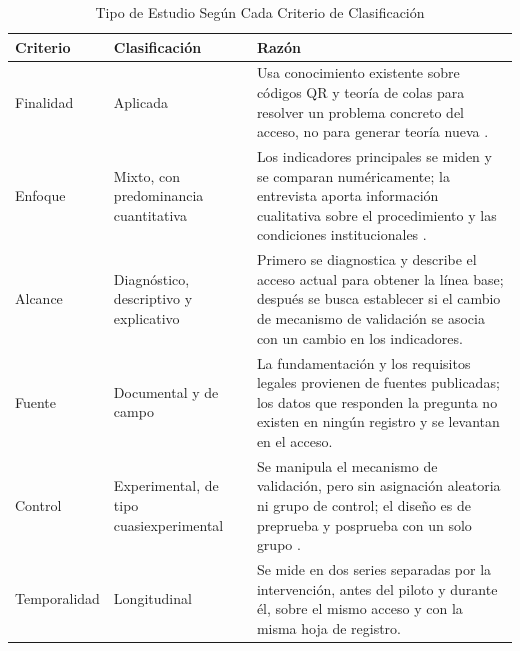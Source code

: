 \begin{table}[tbp]
	\caption{Tipo de Estudio Según Cada Criterio de Clasificación}
	\label{tab:tipo-estudio}
	\small\linespread{1}\selectfont
	\begin{tabular}{@{}P{2.3cm}P{3.6cm}P{9.6cm}@{}}
		\toprule
		Criterio     & Clasificación                                   & Razón                                                                                                                                                                                                         \\
		\midrule
		Finalidad    & Aplicada                                        & Usa conocimiento existente sobre códigos QR y teoría de colas para resolver un problema concreto del acceso, no para generar teoría nueva \parencite{oecd2015frascati}.                                      \\[0.5em]
		Enfoque      & Mixto, con predominancia cuantitativa           & Los indicadores principales se miden y se comparan numéricamente; la entrevista aporta información cualitativa sobre el procedimiento y las condiciones institucionales \parencite{hernandezsampieri2014metodologia}. \\[0.5em]
		Alcance      & Diagnóstico, descriptivo y explicativo          & Primero se diagnostica y describe el acceso actual para obtener la línea base; después se busca establecer si el cambio de mecanismo de validación se asocia con un cambio en los indicadores.             \\[0.5em]
		Fuente       & Documental y de campo                           & La fundamentación y los requisitos legales provienen de fuentes publicadas; los datos que responden la pregunta no existen en ningún registro y se levantan en el acceso.                                     \\[0.5em]
		Control      & Experimental, de tipo cuasiexperimental         & Se manipula el mecanismo de validación, pero sin asignación aleatoria ni grupo de control; el diseño es de preprueba y posprueba con un solo grupo \parencite{campbellstanley1963}.                      \\[0.5em]
		Temporalidad & Longitudinal                                    & Se mide en dos series separadas por la intervención, antes del piloto y durante él, sobre el mismo acceso y con la misma hoja de registro.                                                                   \\
		\bottomrule
	\end{tabular}
\end{table}

